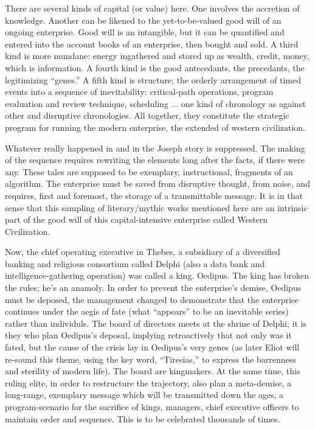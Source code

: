 There are several kinds of capital (or value) here. One involves the accretion of
knowledge. Another can be likened to the
yet-to-be-valued good will of an ongoing
enterprise. Good will is an intangible, but it
can be quantified and entered into the account books of an enterprise, then bought
and sold. A third kind is more mundane:
energy ingathered and stored up as wealth,
credit, money, which is information. A
fourth kind is the good antecedants,
the precedants, the legitimizing \enquote{genes.} A fifth
kind is structure; the orderly arrangement of
timed events into a sequence of inevitability:
critical-path operations, program evaluation
and review technique, scheduling ... one
kind of chronology as against other and
disruptive chronologies. All together, they
constitute the strategic program for running
the modern enterprise, the extended 
of western civilization.

Whatever really happened in  and
in the Joseph story is suppressed. The making of the sequence requires rewriting the
elements long after the facts, if there were
any. These tales are supposed to be exemplary, instructional, fragments of an algorithm. The enterprise must be saved from
disruptive thought, from noise, and requires,
first and foremost,
the storage of a transmittable message. It is in that sense that this
sampling of literary\slash mythic works mentioned
here are an intrinsic part of the good will of
this capital-intensive enterprise called Western Civilization.

Now, the chief operating executive in
Thebes, a subsidiary of a diversified banking
and religious consortium called Delphi (also
a data bank and intelligence-gathering operation) was called a king. Oedipus. The
king has broken the rules; he's an anamoly.
In order to prevent the enterprise's demise,
Oedipus must be deposed, the management
changed to demonstrate that the enterprise
continues under the aegis of fate (what \enquote{appears} to be an inevitable series) rather than
individuls. The board of directors meets at
the shrine of Delphi; it is they who plan
Oedipus's deposal, implying retroactively
that not only was it fated, but the cause of the
crisis lay in Oedipus's very genes (as later
Eliot will re-sound this theme, using the key
word, \enquote{Tiresias,} to express the barrenness
and sterility of modern life). The board are
kingmakers. At the same time, this ruling
elite, in order to restructure the trajectory,
also plan a meta-demise, a long-range, exemplary message which will be transmitted
down the ages, a program-scenario for the
sacrifice of kings, managers, chief executive
officers to maintain order and sequence.
This is to be celebrated thousands of times.

